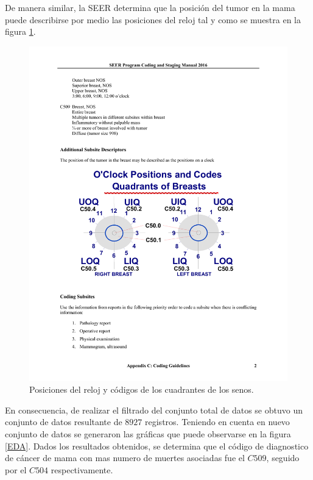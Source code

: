 \begin{table}
\begin{threeparttable}[hbt!]
\begin{tabular}{ p{2cm} p{6cm}}
		\\ \hline	
		\end{tabular}
	\end{threeparttable}
\end{table}

\newpage
De manera similar, la SEER determina que la posición del tumor en la mama puede describirse por medio las posiciones del reloj tal y como se muestra en la figura \ref{Breast_Clock}.

\begin{figure}[h!]
	\centering
	\includegraphics[width=1
	\linewidth]{IMAGENES/BREAST_CLOCK_POSITION}
	\caption{Posiciones del reloj y códigos de los cuadrantes de los senos.}
	\label{Breast_Clock}
\end{figure}

En consecuencia, de  realizar el filtrado del conjunto total de datos se obtuvo un conjunto de datos resultante de $8927$ registros. Teniendo en cuenta en nuevo conjunto de datos se generaron las gráficas que puede observarse en la figura \ref{EDA}. Dados los resultados obtenidos, se determina que  el código de diagnostico de cáncer de mama con mas numero de muertes asociadas fue el $C509$, seguido por el $C504$ respectivamente. 

